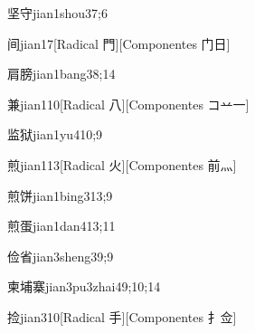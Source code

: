 \begin{verbete}{坚守}{jian1shou3}{7;6}
\end{verbete}

\begin{verbete}{间}{jian1}{7}[Radical 門][Componentes 门日]
\end{verbete}

\begin{verbete}{肩膀}{jian1bang3}{8;14}
\end{verbete}

\begin{verbete}{兼}{jian1}{10}[Radical 八][Componentes コ䒑一]
\end{verbete}

\begin{verbete}{监狱}{jian1yu4}{10;9}
\end{verbete}

\begin{verbete}{煎}{jian1}{13}[Radical 火][Componentes 前灬]
\end{verbete}

\begin{verbete}{煎饼}{jian1bing3}{13;9}
\end{verbete}

\begin{verbete}{煎蛋}{jian1dan4}{13;11}
\end{verbete}

\begin{verbete}{俭省}{jian3sheng3}{9;9}
\end{verbete}

\begin{verbete}{柬埔寨}{jian3pu3zhai4}{9;10;14}
\end{verbete}

\begin{verbete}{捡}{jian3}{10}[Radical 手][Componentes 扌佥]
\end{verbete}

